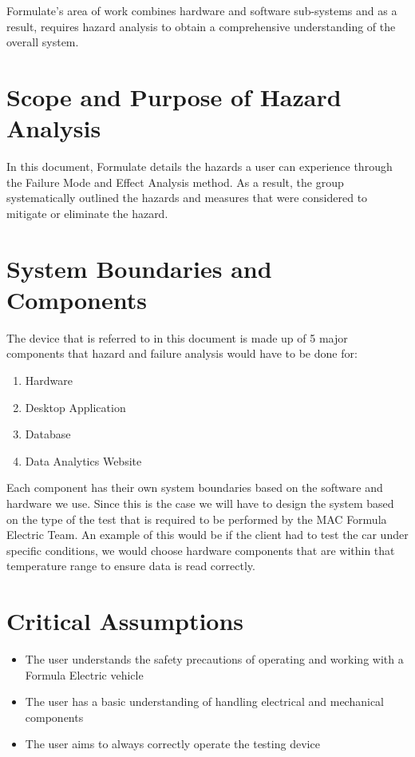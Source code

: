 \documentclass[12pt]{article}
\begin{document}
Formulate's area of work combines hardware and software sub-systems and as a result, requires hazard analysis to obtain a comprehensive understanding of the overall system. 


\section{Scope and Purpose of Hazard Analysis}

In this document, Formulate details the hazards a user can experience through the Failure Mode and Effect Analysis method. As a result, the group systematically outlined the hazards and measures that were considered to mitigate or eliminate the hazard.

\section{System Boundaries and Components}

The device that is referred to in this document is made up of 5 major components that hazard and failure analysis would have to be done for:

\begin{enumerate}
\item Hardware
\item Desktop Application
\item Database
\item Data Analytics Website 
\end{enumerate}

Each component has their own system boundaries based on the software and hardware we use. Since this is the case we will have to design the system based on the type of the test that is required to be performed by the MAC Formula Electric Team. An example of this would be if the client had to test the car under specific conditions, we would choose hardware components that are within that temperature range to ensure data is read correctly.

\newpage
\section{Critical Assumptions}

\begin{itemize}
	\item The user understands the safety precautions of operating and working with a Formula Electric vehicle
	\item The user has a basic understanding of handling electrical and mechanical components
	\item The user aims to always correctly operate the testing device
\end{itemize}
\end{document}
